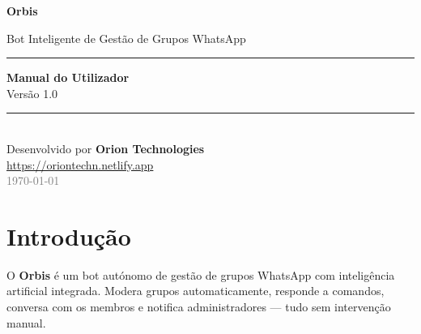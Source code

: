 \documentclass[12pt,a4paper]{article}
\begin{document}
\begin{titlepage}
  \pagecolor{orbisDark}
  \color{white}
  \centering
  \vspace*{3cm}

  {\fontsize{60}{60}\selectfont \textcolor{orbisMid}{\faRobot}}

  \vspace{1cm}
  {\fontsize{48}{48}\selectfont \textbf{Orbis}}

  \vspace{0.4cm}
  {\large \textcolor{orbisMid}{Bot Inteligente de Gestão de Grupos WhatsApp}}

  \vspace{2cm}
  \textcolor{orbisMid}{\rule{10cm}{0.6pt}}
  \vspace{0.6cm}

  {\Large \textbf{Manual do Utilizador}}\\[0.4cm]
  {\normalsize Versão 1.0}

  \vfill

  \textcolor{orbisMid}{\rule{10cm}{0.4pt}}\\[0.5cm]
  {\small Desenvolvido por \textbf{Orion Technologies}}\\[0.2cm]
  {\small \textcolor{gray}{\url{https://oriontechn.netlify.app}}}\\[0.6cm]
  {\small \textcolor{gray}{\today}}
\end{titlepage}
\pagecolor{white}\color{black}

\newpage
\tableofcontents
\newpage


\section{Introdução}

O \textbf{Orbis} é um bot autónomo de gestão de grupos WhatsApp com inteligência artificial integrada. Modera grupos automaticamente, responde a comandos, conversa com os membros e notifica administradores — tudo sem intervenção manual.
\end{document}
